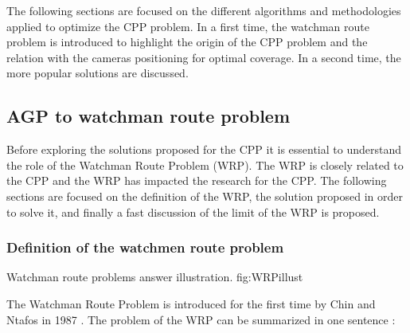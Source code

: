   The following sections are focused on the different algorithms and methodologies applied to optimize the CPP problem. In a first time, the watchman route problem is introduced to highlight the origin of the CPP problem and the relation with the cameras positioning for optimal coverage. In a second time, the more popular solutions are discussed.
 


%
%


\subsection{AGP  to watchman route problem}\label{sec:WRP}


Before exploring the solutions proposed for the CPP it is essential to understand the role of the Watchman Route Problem (WRP). The WRP is closely related to the CPP and the WRP has impacted the research for the CPP. 
The following sections are focused on the definition of the WRP, the solution proposed in order to solve it, and finally a fast discussion of the limit of the WRP  is proposed.
 
\subsubsection{Definition of the watchmen route problem }

 \begin{mfigures}[!]
{Watchman route problems answer illustration. }{fig:WRPillust} \centering
{}
\hspace{1cm}
\end{mfigures}	
The Watchman Route Problem is introduced for the first time by Chin and Ntafos in 1987 \cite{54*chin1988}. The problem of the WRP can be summarized in one sentence :

